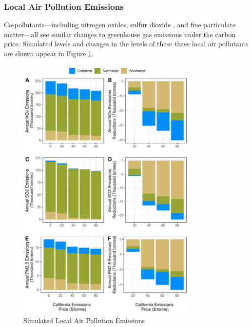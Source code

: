 \subsubsection*{Local Air Pollution Emissions}

Co-pollutants---including nitrogen oxides, sulfur dioxide , and fine particulate matter---all see similar changes to greenhouse gas emissions under the carbon price. Simulated levels and changes in the levels of these three local air pollutants are shown appear in Figure \ref{sim_pol_bca}. 

\begin{figure}
    \centering
    \caption{Simulated Local Air Pollution Emissions\label{sim_pol_bca}}
    \includegraphics[width=0.8\textwidth]{figures/chapter5_figures/sim_pol_bca.pdf}
\end{figure}

